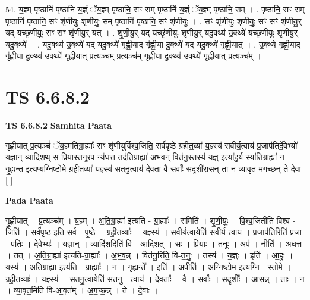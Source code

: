\documentclass[17pt]{extarticle}
\begin{document}
54. य॒ज्ञ्म् पृ॒ष्ठानि॑ पृ॒ष्ठानि॑ य॒ज्ञ्ं ॅय॒ज्ञ्म् पृ॒ष्ठानि॒ सꣳ सम् पृ॒ष्ठानि॑ य॒ज्ञ्ं ॅय॒ज्ञ्म् पृ॒ष्ठानि॒ सम् । . पृ॒ष्ठानि॒ सꣳ सम् पृ॒ष्ठानि॑ पृ॒ष्ठानि॒ सꣳ शृ॑णीयुः शृणीयुः॒ सम् पृ॒ष्ठानि॑ पृ॒ष्ठानि॒ सꣳ शृ॑णीयुः । . सꣳ शृ॑णीयुः शृणीयुः॒ सꣳ सꣳ शृ॑णीयु॒र् यद् यच्छृ॑णीयुः॒ सꣳ सꣳ शृ॑णीयु॒र् यत् । . शृ॒णी॒यु॒र् यद् यच्छृ॑णीयुः शृणीयु॒र् यदु॒क्थ्य॑ उ॒क्थ्ये॑ यच्छृ॑णीयुः शृणीयु॒र् यदु॒क्थ्ये᳚ । . यदु॒क्थ्य॑ उ॒क्थ्ये॑ यद् यदु॒क्थ्ये॑ गृह्णी॒याद् गृ॑ह्णी॒या दु॒क्थ्ये॑ यद् यदु॒क्थ्ये॑ गृह्णी॒यात् । . उ॒क्थ्ये॑ गृह्णी॒याद् गृ॑ह्णी॒या दु॒क्थ्य॑ उ॒क्थ्ये॑ गृह्णी॒यात् प्र॒त्यञ्च॑म् प्र॒त्यञ्च॑म् गृह्णी॒या दु॒क्थ्य॑ उ॒क्थ्ये॑ गृह्णी॒यात् प्र॒त्यञ्च᳚म् । \newline
\pagebreak
{}

\section{ TS 6.6.8.2 }

\textbf{TS 6.6.8.2 } \newline
\textbf{Samhita Paata} \newline

गृह्णी॒यात् प्र॒त्यञ्चं॑ ॅय॒ज्ञ्म॑तिग्रा॒ह्याः᳚ सꣳ शृ॑णीयुर्विश्व॒जिति॒ सर्व॑पृष्ठे ग्रहीत॒व्या॑ य॒ज्ञ्स्य॑ सवीर्य॒त्वाय॑ प्र॒जाप॑तिर्दे॒वेभ्यो॑ य॒ज्ञान् व्यादि॑श॒थ् स प्रि॒यास्त॒नूरप॒ न्य॑धत्त॒ तद॑तिग्रा॒ह्या॑ अभव॒न् वित॑नु॒स्तस्य॑ य॒ज्ञ् इत्या॑हु॒र्य-स्या॑तिग्रा॒ह्या॑ न गृ॒ह्यन्त॒ इत्यप्य॑ग्निष्टो॒मे ग्र॑हीत॒व्या॑ य॒ज्ञ्स्य॑ सतनु॒त्वाय॑ दे॒वता॒ वै सर्वाः᳚ स॒दृशी॑रास॒न् ता न व्या॒वृत॑-मगच्छ॒न् ते दे॒वा- [  ] \newline

\textbf{Pada Paata} \newline

गृ॒ह्णी॒यात् । प्र॒त्यञ्च᳚म् । य॒ज्ञ्म् । अ॒ति॒ग्रा॒ह्या॑ इत्य॑ति - ग्रा॒ह्याः᳚ । समिति॑ । शृ॒णी॒युः॒ । वि॒श्व॒जितीति॑ विश्व - जिति॑ । सर्व॑पृष्ठ॒ इति॒ सर्व॑ - पृ॒ष्ठे॒ । ग्र॒ही॒त॒व्याः᳚ । य॒ज्ञ्स्य॑ । स॒वी॒र्य॒त्वायेति॑ सवीर्य-त्वाय॑ । प्र॒जाप॑ति॒रिति॑ प्र॒जा - प॒तिः॒ । दे॒वेभ्यः॑ । य॒ज्ञान् । व्यादि॑श॒दिति॑ वि - आदि॑शत् । सः । प्रि॒याः । त॒नूः । अप॑ । नीति॑ । अ॒ध॒त्त॒ । तत् । अ॒ति॒ग्रा॒ह्या॑ इत्य॑ति-ग्रा॒ह्याः᳚ । अ॒भ॒व॒न्न् । वित॑नु॒रिति॒ वि-त॒नुः॒ । तस्य॑ । य॒ज्ञ्ः । इति॑ । आ॒हुः॒ । यस्य॑ । अ॒ति॒ग्रा॒ह्या॑ इत्य॑ति - ग्रा॒ह्याः᳚ । न । गृ॒ह्यन्ते᳚ । इति॑ । अपीति॑ । अ॒ग्नि॒ष्टो॒म इत्य॑ग्नि - स्तो॒मे । ग्र॒ही॒त॒व्याः᳚ । य॒ज्ञ्स्य॑ । स॒त॒नु॒त्वायेति॑ सतनु - त्वाय॑ । दे॒वताः᳚ । वै । सर्वाः᳚ । स॒दृशीः᳚ । आ॒स॒न्न् । ताः । न । व्या॒वृत॒मिति॑ वि-आ॒वृत᳚म् । अ॒ग॒च्छ॒न्न् । ते । दे॒वाः ।  \newline
\end{document}
